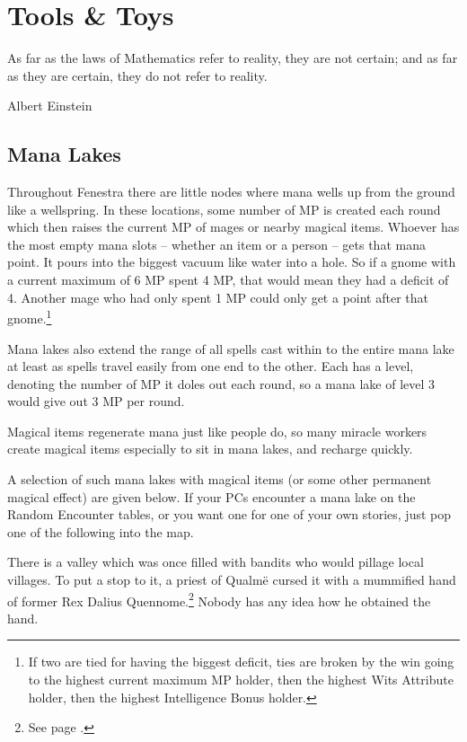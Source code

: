 \chapter{Tools \& Toys}

\epigraph{As far as the laws of Mathematics refer to reality, they are not certain; and as far as they are certain, they do not refer to reality.}{Albert Einstein}

\section{Mana Lakes}\label{mana_lake}

\begin{multicols}{2}

\noindent
Throughout Fenestra there are little nodes where mana wells up from the ground like a wellspring.
In these locations, some number of MP is created each round which then raises the current MP of mages or nearby magical items.
Whoever has the most empty mana slots -- whether an item or a person -- gets that mana point.
It pours into the biggest vacuum like water into a hole.
So if a gnome with a current maximum of 6 MP spent 4 MP, that would mean they had a deficit of 4.
Another mage who had only spent 1 MP could only get a point after that gnome.\footnote{If two are tied for having the biggest deficit, ties are broken by the win going to the highest current maximum MP holder, then the highest Wits Attribute holder, then the highest Intelligence Bonus holder.}

Mana lakes also extend the range of all spells cast within to the entire mana lake at least as spells travel easily from one end to the other.  Each has a level, denoting the number of MP it doles out each round, so a mana lake of level 3 would give out 3 MP per round.

Magical items regenerate mana just like people do, so many miracle workers create magical items especially to sit in mana lakes, and recharge quickly.

A selection of such mana lakes with magical items (or some other permanent magical effect) are given below.
If your PCs encounter a mana lake on the Random Encounter tables, or you want one for one of your own stories, just pop one of the following into the map.


There is a valley which was once filled with bandits who would pillage local villages.
To put a stop to it, a priest of Qualm\"{e} cursed it with a mummified hand of former Rex Dalius Quennome.\footnote{See page \pageref{h_dalius}.}
Nobody has any idea how he obtained the hand.


\end{multicols}
